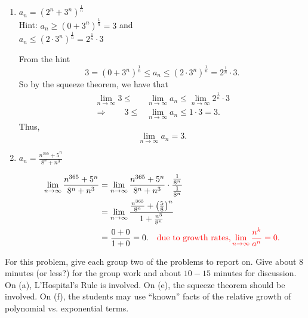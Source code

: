 \documentclass[noinstructornotes]{ximera}
\begin{document}
\begin{problem}
\begin{enumerate}
	\item  $a_n = (2^n + 3^n)^{\frac{1}{n}}$  \\
	Hint:  $a_n \geq (0+3^n)^{\frac{1}{n}} = 3$ and \\ $a_n \leq (2 \cdot 3^n)^{\frac{1}{n}} = 2^{\frac{1}{n}} \cdot 3$
	\begin{freeResponse}
	From the hint
		\[
		3 = (0+3^n)^\frac{1}{n}  \leq a_n \leq (2 \cdot 3^n)^\frac{1}{n} = 2^\frac{1}{n} \cdot 3.
		\]
	So by the squeeze theorem, we have that
		\begin{align*}
		\lim_{n \to \infty} 3 \leq &\lim_{n \to \infty} a_n \leq \lim_{n \to \infty} 2^\frac{1}{n} \cdot 3  \\
		\Longrightarrow 	\qquad	3 \leq &\lim_{n \to \infty} a_n \leq 1 \cdot 3 = 3.
		\end{align*}
	Thus,
		\[
		\lim_{n \to \infty} a_n = 3.
		\]
	\end{freeResponse}
	
	
	
	\item  $a_n = \frac{n^{365} + 5^n}{8^n + n^3}$
	\begin{freeResponse}
		\begin{align*}
		\lim_{n \to \infty} \frac{n^{365} + 5^n}{8^n + n^3}
		&= \lim_{n \to \infty} \frac{n^{365} + 5^n}{8^n + n^3} \cdot \frac{\frac{1}{8^n}}{\frac{1}{8^n}}  \\
		&=  \lim_{n \to \infty} \frac{\frac{n^{365}}{8^n} + \left( \frac{5}{8} \right)^n}{1 + \frac{n^3}{8^n}}  \\
		&= \frac{0+0}{1+0} = 0.		\quad	{\color{red}\text{due to growth rates,} \lim_{n \to \infty} \frac{n^k}{a^n} = 0.}
		\end{align*}
	\end{freeResponse}
	
	

	\end{enumerate}
	
\end{problem}

\begin{instructorNotes}
For this problem, give each group two of the problems to report on.  
Give about $8$ minutes (or less?) for the group work and about $10-15$ minutes for discussion.  
On (a), L'Hospital's Rule is involved.  
On (e), the squeeze theorem should be involved.  
On (f), the students may use ``known'' facts of the relative growth of polynomial vs. exponential terms.
\end{instructorNotes}
\end{document}
